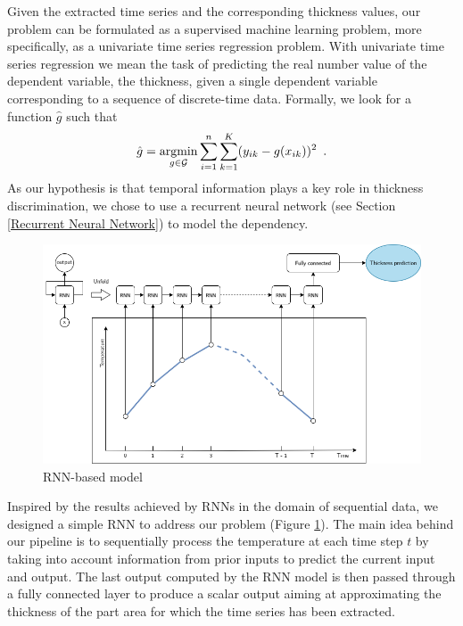 Given the extracted time series and the corresponding thickness values, our problem can be formulated as a supervised machine learning problem, more specifically, as a univariate time series regression problem. With univariate time series regression we mean the task of predicting the real number value of the dependent variable, the thickness, given a single dependent variable corresponding to a sequence of discrete-time data. 
Formally, we look for a function $\hat{g}$ such that
\begin{equation}
    \hat{g} = \operatorname*{argmin}_{g\in\mathcal{G}} \sum_{i=1}^n \sum_{k=1}^K (y_{ik} - g(x_{ik}))^2 \enspace.
\end{equation}
%
As our hypothesis is that temporal information plays a key role in thickness discrimination, we chose to use a recurrent neural network (see Section \ref{Recurrent Neural Network}) to model the dependency. 
%
\begin{figure}
\centering
\includegraphics[scale=0.45]{images/chapter_4/rnn_model.png}
\caption{RNN-based model}
\label{fig:rnn_model}
\end{figure}
%
Inspired by the results achieved by RNNs in the domain of sequential data, we designed a simple RNN to address our problem (Figure \ref{fig:rnn_model}). The main idea behind our pipeline is to sequentially process the temperature at each time step $t$ by taking into account information from prior inputs to predict the current input and output. The last output computed by the RNN model is then passed through a fully connected layer to produce a scalar output aiming at approximating the thickness of the part area for which the time series has been extracted.

